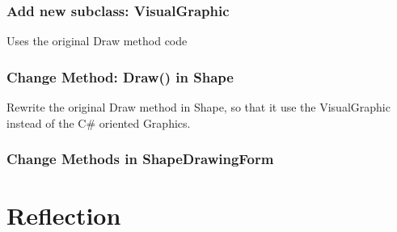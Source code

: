 \documentclass[a4paper,12pt]{article}
\begin{document}
\subsubsection{Add new subclass: VisualGraphic}
Uses the original Draw method code

\subsubsection{Change Method: Draw() in Shape}
Rewrite the original Draw method in Shape, so that it use the VisualGraphic instead of the C\# oriented Graphics.

\subsubsection{Change Methods in ShapeDrawingForm}


\section{Reflection}
\end{document}
